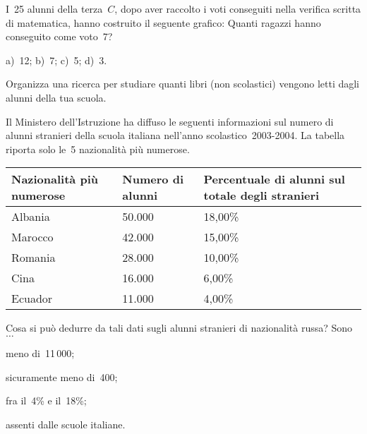 \begin{multicols}{2}
\begin{esercizio}
\label{ese:A.56}
I~25 alunni della terza~\(C\), dopo aver raccolto i voti conseguiti
nella verifica scritta di matematica, hanno costruito il seguente grafico:
Quanti ragazzi hanno conseguito come voto~7?

a)~12; \quad b)~7; \quad c)~5; \quad d)~3.
\begin{center}
 
\end{center}
\end{esercizio}
\end{multicols}

\begin{esercizio}
\label{ese:A.57}
Organizza una ricerca per studiare quanti libri (non scolastici) vengono 
letti
dagli alunni della tua scuola.
\end{esercizio}

%  

\begin{esercizio}
\label{ese:A.58}
Il Ministero dell'Istruzione ha diffuso le seguenti informazioni sul numero 
di alunni stranieri della scuola italiana
nell'anno scolastico~2003-2004. La tabella riporta solo le~5 nazionalità 
più numerose.
\begin{center}
 \begin{tabularx}{.9\textwidth}{*{3}{X}}
\toprule
Nazionalità più numerose & Numero di alunni & Percentuale di alunni sul 
totale degli stranieri \\
\midrule
Albania & 50.000 & 18,00\% \\
Marocco & 42.000 & 15,00\% \\
Romania & 28.000 & 10,00\% \\
Cina & 16.000 & 6,00\% \\
Ecuador & 11.000 & 4,00\% \\
\bottomrule
\end{tabularx}
\end{center}

Cosa si può dedurre da tali dati sugli alunni stranieri di nazionalità 
russa? Sono~\(\ldots\)
\begin{multicols}{2}
\begin{enumeratea}
 \item meno di~11\,000;
 \item sicuramente meno di~400;
 \item fra il~4\% e il~18\%;
 \item assenti dalle scuole italiane.
\end{enumeratea}
\end{multicols}
\end{esercizio}

